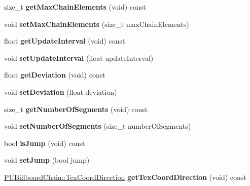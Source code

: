 \begin{DoxyCompactItemize}
\item 
\mbox{\label{classPUBeamRender_af68debe9f6b40e3989e462a347e75434}} 
size\+\_\+t {\bfseries get\+Max\+Chain\+Elements} (void) const
\item 
\mbox{\label{classPUBeamRender_a110ba05b68604b5dd26c34cc7c4c3c0b}} 
void {\bfseries set\+Max\+Chain\+Elements} (size\+\_\+t max\+Chain\+Elements)
\item 
\mbox{\label{classPUBeamRender_ac0d2723c268db55a27aaf407eac4bf21}} 
float {\bfseries get\+Update\+Interval} (void) const
\item 
\mbox{\label{classPUBeamRender_a6e23539c47ccc92cb276c7e61177a541}} 
void {\bfseries set\+Update\+Interval} (float update\+Interval)
\item 
\mbox{\label{classPUBeamRender_a335f485befb89b690810631244b866ae}} 
float {\bfseries get\+Deviation} (void) const
\item 
\mbox{\label{classPUBeamRender_a661c472013a9e3609801d9cb45ced9f9}} 
void {\bfseries set\+Deviation} (float deviation)
\item 
\mbox{\label{classPUBeamRender_a81a35a8e74e572ce37779405dcf538b7}} 
size\+\_\+t {\bfseries get\+Number\+Of\+Segments} (void) const
\item 
\mbox{\label{classPUBeamRender_a5a5a91d5a08d68c8655ed4aec519798a}} 
void {\bfseries set\+Number\+Of\+Segments} (size\+\_\+t number\+Of\+Segments)
\item 
\mbox{\label{classPUBeamRender_a812ab20f7988abfefba5401b4162ce01}} 
bool {\bfseries is\+Jump} (void) const
\item 
\mbox{\label{classPUBeamRender_a18c5bc322f76811d5380edbd4dd9ac7c}} 
void {\bfseries set\+Jump} (bool jump)
\item 
\mbox{\label{classPUBeamRender_a4dc40efadb4c52bc49918d8667cb9581}} 
\hyperlink{classPUBillboardChain_a6ebaec09a615199356b9d50fdab2209f}{P\+U\+Billboard\+Chain\+::\+Tex\+Coord\+Direction} {\bfseries get\+Tex\+Coord\+Direction} (void) const

\end{DoxyCompactItemize}
